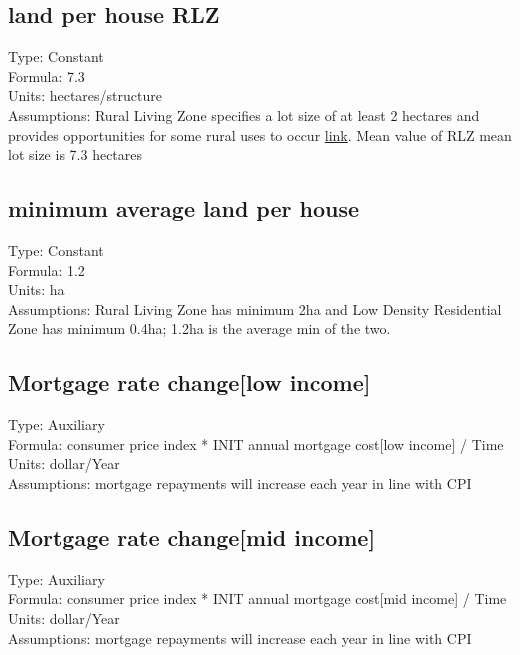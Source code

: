 \documentclass[
  11pt,
]{book}
\begin{document}
\hypertarget{land-per-house-rlz-1}{%
\subsection{land per house RLZ}\label{land-per-house-rlz-1}}

Type: Constant\\
Formula: 7.3\\
Units: hectares/structure\\
Assumptions: Rural Living Zone specifies a lot size of at least 2 hectares and provides opportunities for some rural uses to occur \href{https://www.planning.vic.gov.au/__data/assets/pdf_file/0026/97172/PPN37-Rural-Residential-Development_June-2015.pdf}{link}. Mean value of RLZ mean lot size is 7.3 hectares

\hypertarget{minimum-average-land-per-house}{%
\subsection{minimum average land per house}\label{minimum-average-land-per-house}}

Type: Constant\\
Formula: 1.2\\
Units: ha\\
Assumptions: Rural Living Zone has minimum 2ha and Low Density Residential Zone has minimum 0.4ha; 1.2ha is the average min of the two.

\hypertarget{mortgage-rate-changelow-income}{%
\subsection{Mortgage rate change{[}low income{]}}\label{mortgage-rate-changelow-income}}

Type: Auxiliary\\
Formula: consumer price index * INIT annual mortgage cost{[}low income{]} / Time\\
Units: dollar/Year\\
Assumptions: mortgage repayments will increase each year in line with CPI

\hypertarget{mortgage-rate-changemid-income}{%
\subsection{Mortgage rate change{[}mid income{]}}\label{mortgage-rate-changemid-income}}

Type: Auxiliary\\
Formula: consumer price index * INIT annual mortgage cost{[}mid income{]} / Time\\
Units: dollar/Year\\
Assumptions: mortgage repayments will increase each year in line with CPI
\end{document}
